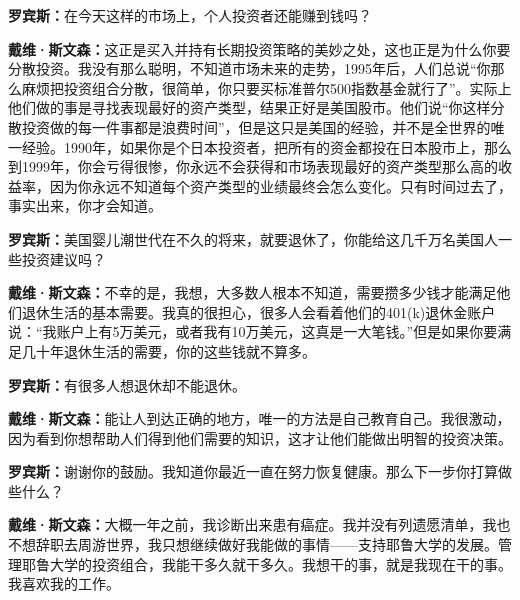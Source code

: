 \begin{BookQuote}
\textbf{罗宾斯：}在今天这样的市场上，个人投资者还能赚到钱吗？
\end{BookQuote}

\begin{BookQuote}
\textbf{戴维·斯文森：}这正是买入并持有长期投资策略的美妙之处，这也正是为什么你要分散投资。我没有那么聪明，不知道市场未来的走势，1995年后，人们总说“你那么麻烦把投资组合分散，很简单，你只要买标准普尔500指数基金就行了”。实际上他们做的事是寻找表现最好的资产类型，结果正好是美国股市。他们说“你这样分散投资做的每一件事都是浪费时间”，但是这只是美国的经验，并不是全世界的唯一经验。1990年，如果你是个日本投资者，把所有的资金都投在日本股市上，那么到1999年，你会亏得很惨，你永远不会获得和市场表现最好的资产类型那么高的收益率，因为你永远不知道每个资产类型的业绩最终会怎么变化。只有时间过去了，事实出来，你才会知道。
\end{BookQuote}

\begin{BookQuote}
\textbf{罗宾斯：}美国婴儿潮世代在不久的将来，就要退休了，你能给这几千万名美国人一些投资建议吗？
\end{BookQuote}

\begin{BookQuote}
\textbf{戴维·斯文森：}不幸的是，我想，大多数人根本不知道，需要攒多少钱才能满足他们退休生活的基本需要。我真的很担心，很多人会看着他们的401(k)退休金账户说：“我账户上有5万美元，或者我有10万美元，这真是一大笔钱。”但是如果你要满足几十年退休生活的需要，你的这些钱就不算多。
\end{BookQuote}

\begin{BookQuote}
\textbf{罗宾斯：}有很多人想退休却不能退休。
\end{BookQuote}

\begin{BookQuote}
\textbf{戴维·斯文森：}能让人到达正确的地方，唯一的方法是自己教育自己。我很激动，因为看到你想帮助人们得到他们需要的知识，这才让他们能做出明智的投资决策。
\end{BookQuote}

\begin{BookQuote}
\textbf{罗宾斯：}谢谢你的鼓励。我知道你最近一直在努力恢复健康。那么下一步你打算做些什么？
\end{BookQuote}

\begin{BookQuote}
\textbf{戴维·斯文森：}大概一年之前，我诊断出来患有癌症。我并没有列遗愿清单，我也不想辞职去周游世界，我只想继续做好我能做的事情——支持耶鲁大学的发展。管理耶鲁大学的投资组合，我能干多久就干多久。我想干的事，就是我现在干的事。我喜欢我的工作。
\end{BookQuote}

